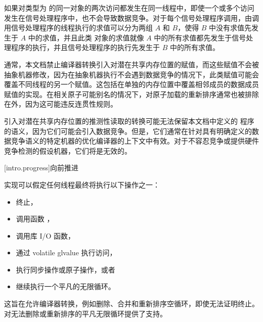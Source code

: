 \pnum
如果对类型为  的同一对象的两次访问都发生在同一线程中，即使一个或多个访问发生在信号处理程序中，也不会导致数据竞争。对于每个信号处理程序调用，由调用信号处理程序的线程执行的求值可以分为两组 $A$ 和 $B$，使得 $B$ 中没有求值先发生于 $A$ 中的求值，并且此类  对象的求值就像 $A$ 中的所有求值都先发生于信号处理程序的执行，并且信号处理程序的执行先发生于 $B$ 中的所有求值。

\pnum
\begin{note}
通常，本文档禁止编译器转换引入对潜在共享内存位置的赋值，而这些赋值不会被抽象机器修改，因为在抽象机器执行不会遇到数据竞争的情况下，此类赋值可能会覆盖不同线程的另一个赋值。这包括在单独的内存位置中覆盖相邻成员的数据成员赋值的实现。在相关原子可能别名的情况下，对原子加载的重新排序通常也被排除在外，因为这可能违反连贯性规则。
\end{note}

\pnum
\begin{note}
引入对潜在共享内存位置的推测性读取的转换可能无法保留本文档中定义的 \Cpp{} 程序的语义，因为它们可能会引入数据竞争。但是，它们通常在针对具有明确定义的数据竞争语义的特定机器的优化编译器的上下文中有效。对于不容忍竞争或提供硬件竞争检测的假设机器，它们将是无效的。
\end{note}

[intro.progress]{向前推进}

\pnum
实现可以假定任何线程最终将执行以下操作之一：
\begin{itemize}
\item 终止，
\item 调用函数 ，
\item 调用库 I/O 函数，
\item 通过 volatile glvalue 执行访问，
\item 执行同步操作或原子操作，或者
\item 继续执行一个平凡的无限循环。
\end{itemize}
\begin{note}
这旨在允许编译器转换，例如删除、合并和重新排序空循环，即使无法证明终止。对无法删除或重新排序的平凡无限循环提供了支持。
\end{note}

